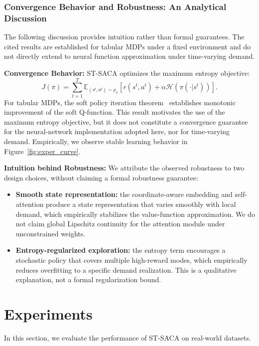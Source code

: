 \documentclass[lettersize,journal]{IEEEtran}
\begin{document}
\subsubsection{Convergence Behavior and Robustness: An Analytical Discussion}
The following discussion provides intuition rather than formal guarantees. The cited results are established for tabular MDPs under a fixed environment and do not directly extend to neural function approximation under time-varying demand.

\textbf{Convergence Behavior:}
ST-SACA optimizes the maximum entropy objective:
\begin{equation}
    J(\pi) = \sum_{t=1}^T \mathbb{E}_{(s^t, a^t) \sim \rho_\pi} [r(s^t, a^t) + \alpha \mathcal{H}(\pi(\cdot|s^t))].
\end{equation}
For tabular MDPs, the soft policy iteration theorem~\cite{icml/HaarnojaZAL18} establishes monotonic improvement of the soft Q-function. This result motivates the use of the maximum entropy objective, but it does not constitute a convergence guarantee for the neural-network implementation adopted here, nor for time-varying demand. Empirically, we observe stable learning behavior in Figure~\ref{fig:exper_curve}.

\textbf{Intuition behind Robustness:}
We attribute the observed robustness to two design choices, without claiming a formal robustness guarantee:
\begin{itemize}
    \item \textbf{Smooth state representation:} the coordinate-aware embedding and self-attention produce a state representation that varies smoothly with local demand, which empirically stabilizes the value-function approximation. We do not claim global Lipschitz continuity for the attention module under unconstrained weights.
    \item \textbf{Entropy-regularized exploration:} the entropy term encourages a stochastic policy that covers multiple high-reward modes, which empirically reduces overfitting to a specific demand realization. This is a qualitative explanation, not a formal regularization bound.
\end{itemize}

\section{Experiments}
\label{sec:experiments}

In this section, we evaluate the performance of ST-SACA on real-world datasets. 
\end{document}
